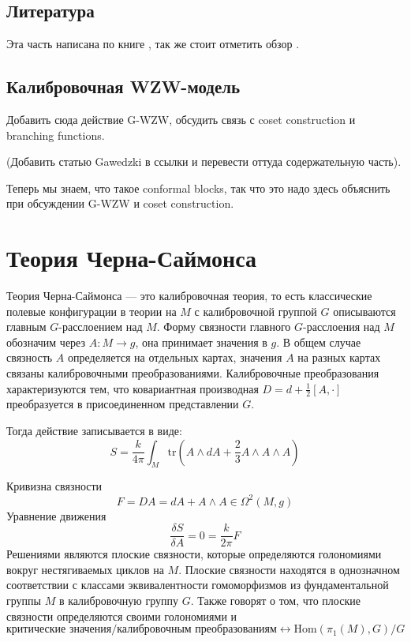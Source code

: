 \documentclass[a4paper,12pt]{article}
\theoremstyle{definition} \newtheorem{Def}{Definition}
\begin{document}
\subsection{Литература}
\label{sec:wzw-literature}

Эта часть написана по книге \cite{difrancesco1997cft}, так же стоит отметить обзор \cite{Walton:1999xc}.

\subsection{Калибровочная WZW-модель}
\label{sec:gauged-wzw}

Добавить сюда действие G-WZW, обсудить связь с coset construction и branching functions.

(Добавить статью Gawedzki в ссылки и перевести оттуда содержательную часть).

Теперь мы знаем, что такое conformal blocks, так что это надо здесь объяснить при обсуждении G-WZW и coset construction.

\section{Теория Черна-Саймонса}
\label{sec:Chern-Simons}

Теория Черна-Саймонса --- это калибровочная теория, то есть классические полевые конфигурации в теории на $M$ с калибровочной группой $G$ описываются главным $G$-расслоением над $M$. Форму связности главного $G$-расслоения над $M$ обозначим через $A:M\to g$, она принимает значения в $g$. В общем случае связность $A$ определяется на отдельных картах, значения $A$ на разных картах связаны калибровочными преобразованиями. Калибровочные преобразования характеризуются тем, что ковариантная производная $D=d+\frac{1}{2}[A,\cdot]$ преобразуется в присоединенном представлении $G$.

Тогда действие записывается в виде:
\begin{equation}
  \label{eq:103}
  S=\frac{k}{4\pi}\int_M \mathrm{tr}(A\wedge dA+\frac{2}{3}A\wedge A\wedge A)
\end{equation}


Кривизна связности
\begin{equation}
  \label{eq:104}
  F=DA=dA+A\wedge A\in \Omega^2(M,g)
\end{equation}
Уравнение движения
\begin{equation}
  \label{eq:3}
  \frac{\delta S}{\delta A}=0=\frac{k}{2\pi}F
\end{equation}
Решениями являются плоские связности, которые определяются голономиями вокруг нестягиваемых циклов на $M$. Плоские связности находятся в однозначном соответствии с классами эквивалентности гомоморфизмов из фундаментальной группы $M$ в калибровочную группу $G$. Также говорят о том, что плоские связности определяются своими голономиями и
\begin{equation}
  \label{eq:8}
  \mbox{критические значения}/\mbox{калибровочным преобразованиям}\leftrightarrow \mathrm{Hom}(\pi_1(M),G)/G
\end{equation}
\end{document}

